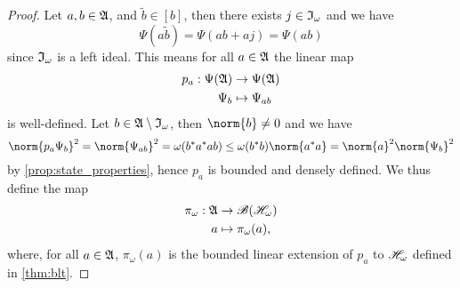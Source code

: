 \begin{proof}
    Let \(a,b \in \mathfrak{A}\), and \(\tilde{b} \in [b]\), then there exists \(j \in \mathfrak{I}_\omega\) and we have
    \begin{equation*}
        \Psi(a \tilde{b}) = \Psi(ab + aj) = \Psi(ab)
    \end{equation*}
    since \(\mathfrak{I}_\omega\) is a left ideal. This means for all \(a \in \mathfrak{A}\) the linear map
    \begin{align*}
        p_a : \Psi(\mathfrak{A}) &\to \Psi(\mathfrak{A})\\
                         \Psi_b &\mapsto \Psi_{ab}
    \end{align*}
    is well-defined. Let \(b \in \mathfrak{A} \setminus \mathfrak{I}_\omega\), then \(\norm{b} \neq 0\) and we have
    \begin{equation*}
        \norm{p_a \Psi_b}^2 = \norm{\Psi_{ab}}^2 = \omega(b^*a^*a b) \leq \omega(b^*b) \norm{a^*a} = \norm{a}^2\norm{\Psi_b}^2
    \end{equation*}
    by \cref{prop:state_properties}, hence \(p_a\) is bounded and densely defined. We thus define the map
    \begin{align*}
        \pi_{\omega} : \mathfrak{A} &\to \mathscr{B}(\mathscr{H}_\omega)\\
                                 a &\mapsto \pi_\omega(a),
    \end{align*}
    where, for all \(a \in \mathfrak{A}\), \(\pi_\omega(a)\) is the bounded linear extension of \(p_a\) to \(\mathscr{H}_\omega\) defined in \cref{thm:blt}.
\end{proof}
